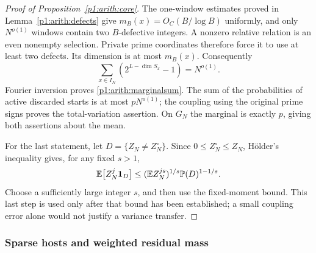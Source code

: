 \begin{proof}[Proof of Proposition~\ref{p1:arith:core}]
The one-window estimates proved in Lemma~\ref{p1:arith:defects} give
$m_B(x)=O_C(B/\log B)$ uniformly, and only $N^{o(1)}$ windows contain two
$B$-defective integers.  A nonzero relative relation is an even nonempty
selection.  Private prime coordinates therefore force it to use at least two
defects.  Its dimension is at most $m_B(x)$.  Consequently
\[
 \sum_{x\in I_N}(2^{L-\dim S_x}-1)=N^{o(1)}.
\]
Fourier inversion proves \eqref{p1:arith:marginalsum}.  The sum of the
probabilities of active discarded starts is at most $pN^{o(1)}$; the coupling
using the original prime signs proves the total-variation assertion.  On $G_N$
the marginal is exactly $p$, giving both assertions about the mean.

For the last statement, let $D=\{Z_N\ne Z_N^\circ\}$.  Since
$0\leq Z_N^\circ\leq Z_N$, H\"older's inequality gives, for any fixed $s>1$,
\[
 \mathbb E\big[Z_N^j\mathbf 1_D\big]
 \leq(\mathbb E Z_N^{js})^{1/s}\mathbb P(D)^{1-1/s}.
\]
Choose a sufficiently large integer $s$, and then use the fixed-moment bound.
This last step is used only after that bound has been established; a small
coupling error alone would not justify a variance transfer.
\end{proof}

\subsubsection{Sparse hosts and weighted residual mass}
\label{p14:comp:sparse-hosts}

